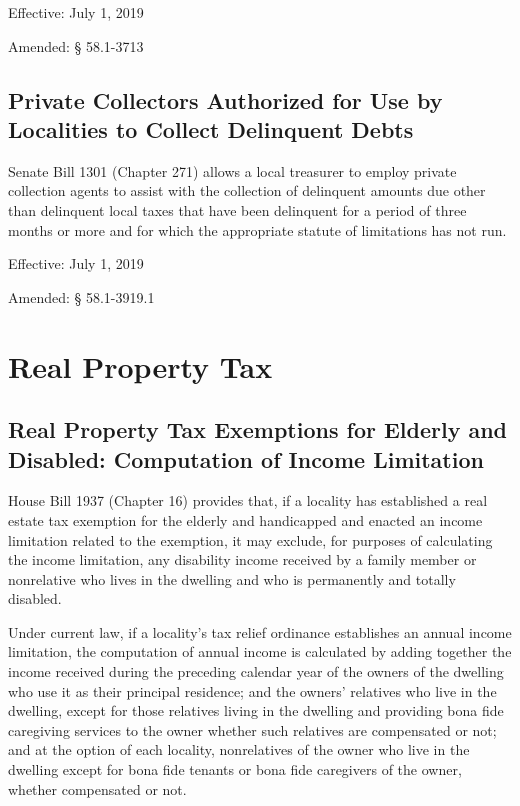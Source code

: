 \documentclass[
]{book}
\begin{document}
Effective: July 1, 2019

Amended: § 58.1-3713

\hypertarget{private-collectors-authorized-for-use-by-localities-to-collect-delinquent-debts}{%
\subsection{Private Collectors Authorized for Use by Localities to Collect Delinquent Debts}\label{private-collectors-authorized-for-use-by-localities-to-collect-delinquent-debts}}

Senate Bill 1301 (Chapter 271) allows a local treasurer to employ private collection agents to assist with the collection of delinquent amounts due other than delinquent local taxes that have been delinquent for a period of three months or more and for which the appropriate statute of limitations has not run.

Effective: July 1, 2019

Amended: § 58.1-3919.1

\hypertarget{real-property-tax}{%
\section{Real Property Tax}\label{real-property-tax}}

\hypertarget{real-property-tax-exemptions-for-elderly-and-disabled-computation-of-income-limitation}{%
\subsection{Real Property Tax Exemptions for Elderly and Disabled: Computation of Income Limitation}\label{real-property-tax-exemptions-for-elderly-and-disabled-computation-of-income-limitation}}

House Bill 1937 (Chapter 16) provides that, if a locality has established a real estate tax exemption for the elderly and handicapped and enacted an income limitation related to the exemption, it may exclude, for purposes of calculating the income limitation, any disability income received by a family member or nonrelative who lives in the dwelling and who is permanently and totally disabled.

Under current law, if a locality's tax relief ordinance establishes an annual income limitation, the computation of annual income is calculated by adding together the income received during the preceding calendar year of the owners of the dwelling who use it as their principal residence; and the owners' relatives who live in the dwelling, except for those relatives living in the dwelling and providing bona fide caregiving services to the owner whether such relatives are compensated or not; and at the option of each locality, nonrelatives of the owner who live in the dwelling except for bona fide tenants or bona fide caregivers of the owner, whether compensated or not.
\end{document}
